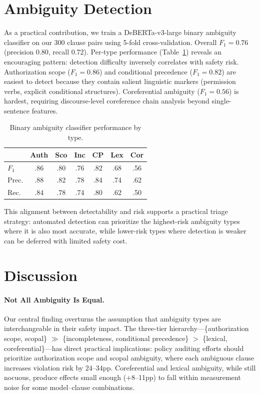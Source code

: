 \documentclass[11pt,a4paper]{article}
\begin{document}
\section{Ambiguity Detection}

As a practical contribution, we train a DeBERTa-v3-large binary ambiguity classifier on our 300 clause pairs using 5-fold cross-validation. Overall $F_1 = 0.76$ (precision 0.80, recall 0.72). Per-type performance (Table~\ref{tab:classifier}) reveals an encouraging pattern: detection difficulty inversely correlates with safety risk. Authorization scope ($F_1 = 0.86$) and conditional precedence ($F_1 = 0.82$) are easiest to detect because they contain salient linguistic markers (permission verbs, explicit conditional structures). Coreferential ambiguity ($F_1 = 0.56$) is hardest, requiring discourse-level coreference chain analysis beyond single-sentence features.

\begin{table}[t]
\centering
\small
\begin{tabular}{@{}lcccccc@{}}
\toprule
& \textbf{Auth} & \textbf{Sco} & \textbf{Inc} & \textbf{CP} & \textbf{Lex} & \textbf{Cor} \\
\midrule
$F_1$ & .86 & .80 & .76 & .82 & .68 & .56 \\
Prec. & .88 & .82 & .78 & .84 & .74 & .62 \\
Rec. & .84 & .78 & .74 & .80 & .62 & .50 \\
\bottomrule
\end{tabular}
\caption{Binary ambiguity classifier performance by type.}
\label{tab:classifier}
\end{table}

This alignment between detectability and risk supports a practical triage strategy: automated detection can prioritize the highest-risk ambiguity types where it is also most accurate, while lower-risk types where detection is weaker can be deferred with limited safety cost.

\section{Discussion}

\paragraph{Not All Ambiguity Is Equal.}
Our central finding overturns the assumption that ambiguity types are interchangeable in their safety impact. The three-tier hierarchy---\{authorization scope, scopal\} $\gg$ \{incompleteness, conditional precedence\} $>$ \{lexical, coreferential\}---has direct practical implications: policy auditing efforts should prioritize authorization scope and scopal ambiguity, where each ambiguous clause increases violation risk by 24--34pp. Coreferential and lexical ambiguity, while still nocuous, produce effects small enough (+8--11pp) to fall within measurement noise for some model--clause combinations.
\end{document}
